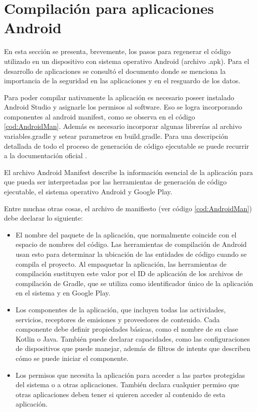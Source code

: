 
\chapter{Compilación para aplicaciones Android} %

\label{AppendixC} %

En esta sección se presenta, brevemente, los pasos para regenerar el código utilizado en un dispositivo con sistema operativo Android (archivo .apk). Para el desarrollo de aplicaciones se consultó el documento \citep{BOOK:3} donde se menciona la importancia de la seguridad en las aplicaciones y en el resguardo de los datos.

Para poder compilar nativamente la aplicación es necesario poseer instalado Android Studio \citep{WEBSITE:41} y asignarle los permisos al software. Eso se logra incorporando componentes al android manifest, como se observa en el código \ref{cod:AndroidMan}. Además es necesario incorporar algunas librerías al archivo variables.gradle y setear parametros en build.gradle. Para una descripción detallada de todo el proceso de generación de código ejecutable se puede recurrir a la documentación oficial \citep{WEBSITE:42}.

El archivo Android Manifest describe la información esencial de la aplicación para que pueda ser interpretadas por las herramientas de generación de código ejecutable, el sistema operativo Android y Google Play.

Entre muchas otras cosas, el archivo de manifiesto (ver código \ref{cod:AndroidMan}) debe declarar lo siguiente:
\begin{itemize}


\item El nombre del paquete de la aplicación, que normalmente coincide con el espacio de nombres del código. Las herramientas de compilación de Android usan esto para determinar la ubicación de las entidades de código cuando se compila el proyecto. Al empaquetar la aplicación, las herramientas de compilación sustituyen este valor por el ID de aplicación de los archivos de compilación de Gradle, que se utiliza como identificador único de la aplicación en el sistema y en Google Play. 
\item Los componentes de la aplicación, que incluyen todas las actividades, servicios, receptores de emisiones y proveedores de contenido. Cada componente debe definir propiedades básicas, como el nombre de su clase Kotlin o Java. También puede declarar capacidades, como las configuraciones de dispositivos que puede manejar, además de filtros de intents que describen cómo se puede iniciar el componente. 
\item Los permisos que necesita la aplicación para acceder a las partes protegidas del sistema o a otras aplicaciones. También declara cualquier permiso que otras aplicaciones deben tener si quieren acceder al contenido de esta aplicación. 
\end{itemize}


